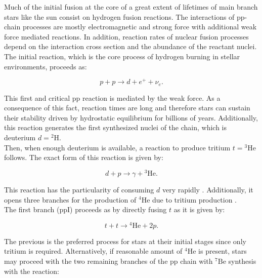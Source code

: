 \documentclass[openany]{book}
\begin{document}
Much of the initial fusion at the core of a great extent of lifetimes of main branch stars like the sun consist on hydrogen fusion reactions. The interactions of pp-chain processes are mostly electromagnetic and strong force with additional weak force mediated reactions. In addition, reaction rates of nuclear fusion processes depend on the interaction cross section and the abundance of the reactant nuclei. \\

The initial reaction, which is the core process of hydrogen burning in stellar environments, proceeds as:  

\begin{equation} \label{eq:reaction_ppMain}
	p + p \rightarrow d + e^{+} + \nu_e.
\end{equation}

This first and critical pp reaction is mediated by the weak force. As a consequence of this fact, reaction times are long and therefore stars can sustain their stability driven by hydrostatic equilibrium for billions of years. Additionally, this reaction generates the first synthesized nuclei of the chain, which is deuterium $d = \mathrm{{}^{2}H}$. \\

Then, when enough deuterium is available, a reaction to produce tritium $t =  \mathrm{{}^{3} He}$ follows. The exact form of this reaction is given by: 

\begin{equation} \label{eq:reaction_2Hpgamma3He}
	d + p  \rightarrow \gamma + {}^{3} \mathrm{He}.
\end{equation}

This reaction has the particularity of consuming $d$ very rapidly \cite{bertulani_2003}. Additionally, it opens three branches for the production of $\mathrm{{}^{4}He}$ due to tritium production \cite{fowler_1958}.\\

The first branch (ppI) proceeds as by directly fusing $t$ as it is given by: 

\begin{equation} \label{eq:reaction_3Hep3He}
	t + t \rightarrow {}^{4}\mathrm{He} + 2p.
\end{equation}

The previous is the preferred process for stars at their initial stages since only tritium is required. Alternatively, if reasonable amount of ${}^{4}\mathrm{He}$ is present, stars may proceed with the two remaining branches of the pp chain with $\mathrm{{}^{7}Be}$ synthesis with the reaction: 
\end{document}
